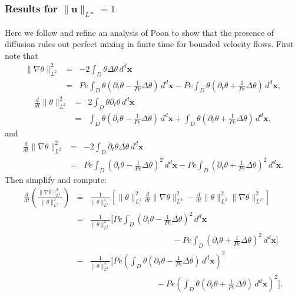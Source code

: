 \documentclass[12pt]{iopart}
\newcommand{\ddt}[1]{\frac{d #1}{dt}}
\newcommand{\ltwo}[1]{\|#1\|_{L^{2}}}
\newcommand{\hone}[1]{\| \nabla #1\|_{L^{2}}}
\newcommand{\sint}[1]{\int_{D} #1 \, d^{d}\mathbf{x}}
\newcommand{\linf}[1]{\| #1 \|_{L^{\infty}}}
\renewcommand{\u}{\mathbf{u}}
\newcommand{\ppt}[1]{\partial_{t} #1}
\newcommand{\lap}{\Delta }
\newcommand{\pbrac}[1]{\left( #1 \right)}
\newcommand{\sbrac}[1]{\left[ #1 \right]}
\begin{document}
\subsubsection{Results for $\linf{\u}= 1$}
Here we follow and refine an analysis of Poon \cite{Chi-Cheu1996} to show that the presence of diffusion rules out perfect mixing in finite time for bounded velocity flows.  First note that
%
\begin{eqnarray*}
	 \hone{\theta}^2 &=& - 2\sint{\theta \lap \theta} \\
	 							&=& Pe \sint{\theta\left(\ppt{\theta}
	 									-\frac{1}{Pe}\lap \theta\right)} 
	 									-Pe \sint{\theta\left(\ppt{\theta}
	 									+\frac{1}{Pe}\lap \theta\right)},
\end{eqnarray*}
%
\begin{eqnarray*}
	\ddt{}\ltwo{\theta}^2 &=& 2\sint{\theta\ppt{\theta}} \\
										 &=&\sint{\theta\left(\ppt{\theta}
	 									-\frac{1}{Pe}\lap \theta\right)} 
										 + \sint{\theta\left(\ppt{\theta}
	 									+\frac{1}{Pe}\lap \theta\right)} ,
\end{eqnarray*}
%
and
%
\begin{eqnarray*}
	\ddt{}\hone{\theta}^2 &=& -2\sint{\ppt{\theta}\lap \theta} \\
	 									&=& Pe \sint{\left(\ppt{\theta}
	 									-\frac{1}{Pe}\lap \theta\right)^2} 
	 									-Pe \sint{\left(\ppt{\theta}
	 									+\frac{1}{Pe}\lap \theta\right)^2} .
\end{eqnarray*}
%
Then simplify and compute:
%
\begin{eqnarray*}
	\ddt{} \pbrac{ \frac{\hone{\theta}^2}{\ltwo{\theta}^2} } 
			&=& \frac{1}{\ltwo{\theta}^4}
			\sbrac{
				\ltwo{\theta}^2\ddt{}\hone{\theta}^2
				-\ddt{}\ltwo{\theta}^2\hone{\theta}^2			
			}\\
			&=& \frac{1}{\ltwo{\theta}^2}
			 \Bigg[ Pe \sint{\left(\ppt{\theta} -\frac{1}{Pe}\lap \theta\right)^2}  \\
 				& & \qquad\qquad\qquad \qquad \qquad 
				-Pe\sint{\left(\ppt{\theta}+\frac{1}{Pe}\lap \theta\right)^2} 
			\Bigg]\\
		        &-&\frac{1}{\ltwo{\theta}^4}
			\Bigg[ 
				Pe \pbrac{\sint{\theta\left(\ppt{\theta}-\frac{1}{Pe}\lap \theta\right)} }^2\\
 				& & \qquad\qquad\qquad \qquad
				-Pe\pbrac{
					 \sint{\theta\left(\ppt{\theta}
	 									+\frac{1}{Pe}\lap \theta\right)} 
 				}^2					
			\Bigg].
\end{eqnarray*}
\end{document}
